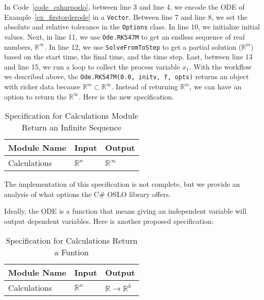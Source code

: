 In Code~\ref{code_csharposlo}, between line 3 and line 4, we encode the ODE of Example~\ref{ex_firstorderode} in a \verb|Vector|. Between line 7 and line 8, we set the absolute and relative tolerance in the \verb|Options| class. In line 10, we initialize initial values. Next, in line 11, we use \verb|Ode.RK547M| to get an endless sequence of real numbers, $\mathbb{R}^{\infty}$. In line 12, we use \verb|SolveFromToStep| to get a partial solution ($\mathbb{R}^m$) based on the start time, the final time, and the time step. Last, between line 13 and line 15, we run a loop to collect the process variable $x_1$. With the workflow we described above, the \verb|Ode.RK547M(0.0, initv, f, opts)| returns an object with richer data because {}$\mathbb{R}^m \subset \mathbb{R}^{\infty}$. Instead of returning $\mathbb{R}^m$, we can have an option to return the $\mathbb{R}^{\infty}$. Here is the new specification.

\begin{table}[ht]
\centering
\begin{tabular}{p{} | p{} | p{}} \hline
    \textbf{Module Name}&\textbf{Input}&\textbf{Output}\\
    \toprule
    Calculations & $\mathbb{R}^n$ & $\mathbb{R}^{\infty}$ \\
    \bottomrule	
\end{tabular}	
\caption{Specification for Calculations Module Return an Infinite Sequence}	
\label{tab_srsforcal}
\end{table}
The implementation of this specification is not complete, but we provide an analysis of what options the C\# OSLO library offers.

Ideally, the ODE is a function that means giving an independent variable will output dependent variables. Here is another proposed specification:
\begin{table}[ht]
\centering
\begin{tabular}{p{} | p{} | p{}} \hline
    \textbf{Module Name}&\textbf{Input}&\textbf{Output}\\
    \toprule
    Calculations & $\mathbb{R}^n$ & $\mathbb{R} \rightarrow \mathbb{R}^k$ \\
    \bottomrule	
\end{tabular}	
\caption{Specification for Calculations Return a Funtion}	
\label{tab_srsforcal}
\end{table}

